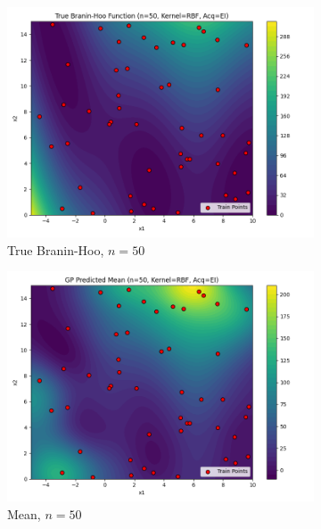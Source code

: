 \documentclass[a4paper,12pt]{article}
\begin{document}
\begin{figure}[H]
\begin{subfigure}{0.3\textwidth}
  \includegraphics[width=\linewidth]{Task-02/images/true_function_rbf_n50_EI.png}
  \caption{True Branin-Hoo, $n=50$}
\end{subfigure}
\begin{subfigure}{0.3\textwidth}
    \includegraphics[width=\linewidth]{Task-02/images/gp_mean_rbf_n50_EI.png}
    \caption{Mean, $n=50$}
\end{subfigure}
\begin{subfigure}{0.3\textwidth}

\end{subfigure}
\end{figure}
\end{document}
